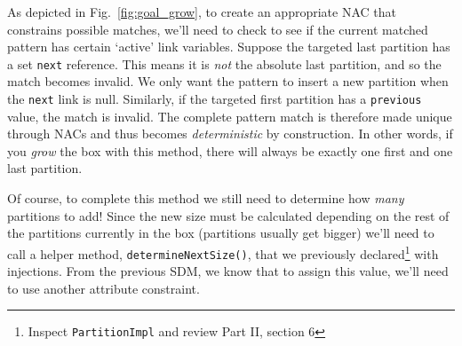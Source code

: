 As depicted in Fig.~\ref{fig:goal_grow}, to create an appropriate \mbox{NAC} that constrains possible matches, we'll need to check to see if the current matched
pattern has certain `active' link variables. Suppose the targeted last partition has a set \texttt{next} reference. This means it is \emph{not} the absolute
last partition, and so the match becomes invalid. We only want the pattern to insert a new partition when the \texttt{next} link is null. Similarly, if the
targeted first partition has a \texttt{previous} value, the match is invalid. The complete pattern match is therefore made unique through NACs and thus becomes
\emph{deterministic} by construction. In other words, if you \emph{grow} the box with this method, there will always be exactly one first and one last
partition.

Of course, to complete this method we still need to determine how \emph{many} partitions to add! Since the new size must be calculated depending on the rest of
the partitions currently in the box (partitions usually get bigger) we'll need to call a helper method, \texttt{determineNextSize()}, that we previously
declared\footnote{Inspect \texttt{PartitionImpl} and review Part II, section 6} with injections. From the previous SDM, we know that to assign this value, we'll
need to use another attribute constraint.





